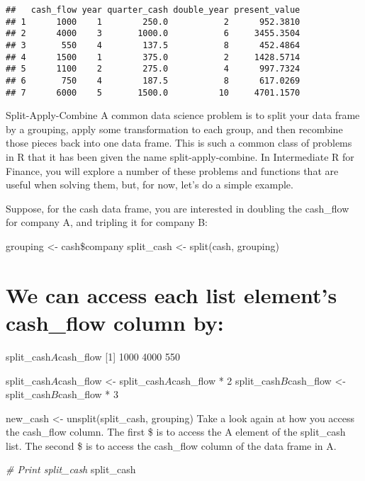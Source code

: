 \documentclass[]{article}
\newenvironment{Shaded}{\begin{snugshade}}{\end{snugshade}}
\newcommand{\CommentTok}[1]{\textcolor[rgb]{0.56,0.35,0.01}{\textit{#1}}}
\newcommand{\NormalTok}[1]{#1}
\begin{document}
\begin{verbatim}
##   cash_flow year quarter_cash double_year present_value
## 1      1000    1        250.0           2      952.3810
## 2      4000    3       1000.0           6     3455.3504
## 3       550    4        137.5           8      452.4864
## 4      1500    1        375.0           2     1428.5714
## 5      1100    2        275.0           4      997.7324
## 6       750    4        187.5           8      617.0269
## 7      6000    5       1500.0          10     4701.1570
\end{verbatim}

Split-Apply-Combine A common data science problem is to split your data
frame by a grouping, apply some transformation to each group, and then
recombine those pieces back into one data frame. This is such a common
class of problems in R that it has been given the name
split-apply-combine. In Intermediate R for Finance, you will explore a
number of these problems and functions that are useful when solving
them, but, for now, let's do a simple example.

Suppose, for the cash data frame, you are interested in doubling the
cash\_flow for company A, and tripling it for company B:

grouping \textless{}- cash\$company split\_cash \textless{}- split(cash,
grouping)

\section{We can access each list element's cash\_flow column
by:}\label{we-can-access-each-list-elements-cash_flow-column-by}

split\_cash\(A\)cash\_flow {[}1{]} 1000 4000 550

split\_cash\(A\)cash\_flow \textless{}- split\_cash\(A\)cash\_flow * 2
split\_cash\(B\)cash\_flow \textless{}- split\_cash\(B\)cash\_flow * 3

new\_cash \textless{}- unsplit(split\_cash, grouping) Take a look again
at how you access the cash\_flow column. The first \$ is to access the A
element of the split\_cash list. The second \$ is to access the
cash\_flow column of the data frame in A.

\begin{Shaded}
\begin{Highlighting}[]
\CommentTok{# Print split_cash}
\NormalTok{split_cash}
\end{Highlighting}
\end{Shaded}
\end{document}
